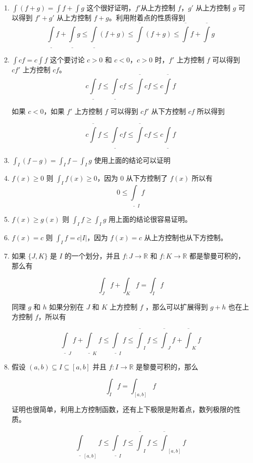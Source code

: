 \begin{enumerate}
    \item $\int(f+g) = \int f + \int g $ 这个很好证明，$f'$从上方控制 $f$，$g'$ 从上方控制 $g$ 可以得到 $f'+g'$ 从上方控制 $f+g$。利用附着点的性质得到
    \[
  \underline{\int}f + \underline{\int}g \le \underline{\int}(f+g)  \le \overline{\int}(f+g) \le \overline{\int}f + \overline{\int}g
    \]

    \item $\int cf = c \int f$ 这个要讨论 $c > 0$ 和 $c < 0$，$c > 0$ 时，$f'$ 上方控制 $f$ 可以得到 $cf'$ 上方控制 $cf$。
    \[
  c\underline{\int}f \le  \underline{\int}cf \le \overline{\int}cf \le c \overline{\int}f 
    \]

    如果 $c < 0$，如果 $f'$ 上方控制 $f$ 可以得到 $cf'$ 从下方控制 $cf$ 所以得到

    \[
      c\overline{\int}f   \le \underline{\int}cf \le \overline{\int} cf \le c \underline{\int}f
    \]

    \item $\int_{I}(f-g) = \int_{I}f - \int_{I}g $ 使用上面的结论可以证明

    \item $f(x) \ge 0$ 则 $\int_{I} f(x) \ge 0$，因为 $0$ 从下方控制了 $f(x)$ 所以有
    \[
        0 \le \underline{\int}_{I} f
    \]

    \item $f(x) \ge g(x)$ 则 $\int_{I}f \ge \int_{I} g$ 用上面的结论很容易证明。

    \item $f(x) = c$ 则 $\int_{I}f = c \lvert I \rvert$，因为 $f(x) =c$ 从上方控制也从下方控制。

    \item 如果 $\{ J, K \} $ 是 $I$ 的一个划分，并且 $f: J \to \mathbb{R}$ 和 $f: K \to \mathbb{R}$ 都是黎曼可积的，那么有

    \[
        \int_{J}f + \int_{K}f = \int_{I}f
    \]

    同理 $g$ 和 $h$ 如果分别在 $J$ 和 $K$ 上方控制 $f$ ，那么可以扩展得到 $g + h$ 也在上方控制 $f$，所以有

    \[
 \underline{\int}_J f + \underline{\int}_K f \le \underline{\int}_I f \le \overline{\int}_I f \le \overline{\int}_J f + \overline{\int}_K f
    \]

    \item 假设 $(a,b) \subseteq I \subseteq [a,b]$ 并且 $f: I \to \mathbb{R}$  是黎曼可积的，那么 

    \[
        \int_{I}f = \int_{[a,b]}f 
    \]

    证明也很简单，利用上方控制函数，还有上下极限是附着点，数列极限的性质。

    \[
 \underline{\int}_{[a,b]}f \le \underline{\int}_{I}f \le \overline{\int}_{I}f \le \overline{\int}_{[a,b]}f 
    \]

\end{enumerate}


